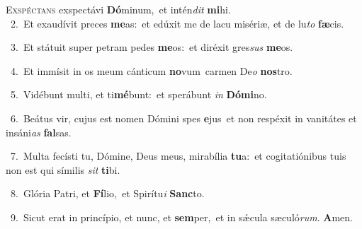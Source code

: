 \lettrine{\initial\textcolor{\initialcolor}{E}}{xspéctans} exspectávi \textbf{Dó}\-minum,~\star et intén\textit{dit} \textbf{mi}\-hi.\\
{\numbfont\textcolor{\numbcolor}{~2.}}~Et exaudívit preces \textbf{me}\-as:~\star et edúxit me de lacu misériæ, et de lu\textit{to} \textbf{fæ}\-cis.\par
{\numbfont\textcolor{\numbcolor}{~3.}}~Et státuit super petram pedes \textbf{me}\-os:~\star et diréxit gres\textit{sus} \textbf{me}\-os.\par
{\numbfont\textcolor{\numbcolor}{~4.}}~Et immísit in os meum cánticum \textbf{no}\-vum~\star carmen De\textit{o} \textbf{nos}\-tro.\par
{\numbfont\textcolor{\numbcolor}{~5.}}~Vidébunt multi, et ti\-\textbf{mé}\-bunt:~\star et sperábunt \textit{in} \textbf{Dó}\-\textbf{mi}no.\par
{\numbfont\textcolor{\numbcolor}{~6.}}~Beátus vir, cujus est nomen Dómini spes \textbf{e}\-jus~\star et non respéxit in vanitátes et insáni\textit{as} \textbf{fal}\-sas.\par
{\numbfont\textcolor{\numbcolor}{~7.}}~Multa fecísti tu, Dómine, Deus meus, mirabília \textbf{tu}\-a:~\star et cogitatiónibus tuis non est qui símilis \textit{sit} \textbf{ti}\-bi.\par
{\numbfont\textcolor{\numbcolor}{~8.}}~Glória Patri, et \textbf{Fí}\-lio,~\star et Spirítu\textit{i} \textbf{Sanc}\-to.\par
{\numbfont\textcolor{\numbcolor}{~9.}}~Sicut erat in princípio, et nunc, et \textbf{sem}\-per,~\star et in sǽcula sæculó\-\textit{rum}\-. \textbf{A}\-men.\par

